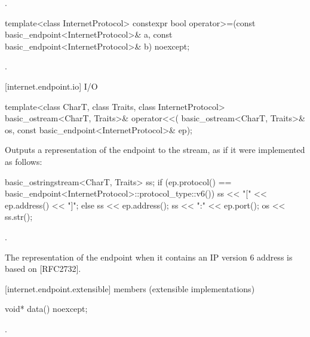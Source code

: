 \begin{itemdescr}
\pnum
\returns {}.
\end{itemdescr}

\begin{itemdecl}
template<class InternetProtocol>
  constexpr bool operator>=(const basic_endpoint<InternetProtocol>& a,
                            const basic_endpoint<InternetProtocol>& b) noexcept;
\end{itemdecl}

\begin{itemdescr}
\pnum
\returns {}.
\end{itemdescr}



[internet.endpoint.io]{ I/O}

\begin{itemdecl}
template<class CharT, class Traits, class InternetProtocol>
  basic_ostream<CharT, Traits>& operator<<(
    basic_ostream<CharT, Traits>& os,
    const basic_endpoint<InternetProtocol>& ep);
\end{itemdecl}

\begin{itemdescr}
\pnum
\effects Outputs a representation of the endpoint to the stream, as if it were implemented as follows: 
\begin{codeblock}
basic_ostringstream<CharT, Traits> ss;
if (ep.protocol() == basic_endpoint<InternetProtocol>::protocol_type::v6())
  ss << "[" << ep.address() << "]";
else
  ss << ep.address();
ss << ":" << ep.port();
os << ss.str();
\end{codeblock}


\pnum
\returns {}.
\end{itemdescr}

\pnum
\begin{note} The representation of the endpoint when it contains an IP version 6 address is based on [RFC2732]. \end{note}


[internet.endpoint.extensible]{ members (extensible implementations)}

\begin{itemdecl}
void* data() noexcept;
\end{itemdecl}

\begin{itemdescr}
\pnum
\returns {}.
\end{itemdescr}

